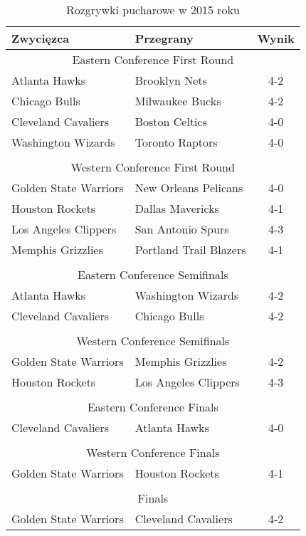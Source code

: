 \documentclass[inzynierska]{pwr_wmat_praca_dyplomowa}
\theoremstyle{plain}
\numberwithin{theorem}{chapter}
\theoremstyle{definition}
\numberwithin{theorem}{chapter}
\begin{document}
\begin{table}[]
	\centering
	\begin{tabular}{ |p{5cm}|p{5cm}|c|  }
		\hline
		\textbf{Zwycięzca}& \textbf{Przegrany} &\textbf{Wynik}\\\hline		
		\multicolumn{3}{|c|}{Eastern Conference First Round} \\\hline
		Atlanta Hawks& Brooklyn Nets &4-2\\\hline
		Chicago Bulls& Milwaukee Bucks&4-2\\\hline
		Cleveland Cavaliers& Boston Celtics &4-0\\\hline
		Washington Wizards& Toronto Raptors&4-0\\\hline
		\multicolumn{3}{|c|}{} \\\hline
		
		\multicolumn{3}{|c|}{Western Conference First Round} \\\hline
		Golden State Warriors &New Orleans Pelicans &4-0\\\hline
		Houston Rockets& Dallas Mavericks&4-1\\\hline
		Los Angeles Clippers& San Antonio Spurs &4-3\\\hline
		Memphis Grizzlies& Portland Trail Blazers&4-1\\\hline
		\multicolumn{3}{|c|}{} \\\hline

		\multicolumn{3}{|c|}{Eastern Conference Semifinals} \\\hline
		Atlanta Hawks& Washington Wizards &4-2\\\hline
		Cleveland Cavaliers& Chicago Bulls&4-2\\\hline
		\multicolumn{3}{|c|}{} \\\hline
		
		\multicolumn{3}{|c|}{Western Conference Semifinals} \\\hline
		Golden State Warriors& Memphis Grizzlies &4-2\\\hline
		Houston Rockets& Los Angeles Clippers&4-3\\\hline
		\multicolumn{3}{|c|}{} \\\hline
		
		\multicolumn{3}{|c|}{Eastern Conference Finals} \\\hline
		Cleveland Cavaliers& Atlanta Hawks&4-0\\\hline
		\multicolumn{3}{|c|}{} \\\hline
		
		\multicolumn{3}{|c|}{Western Conference Finals} \\\hline
		Golden State Warriors& Houston Rockets&4-1\\\hline
		\multicolumn{3}{|c|}{} \\\hline
		
		\multicolumn{3}{|c|}{Finals} \\\hline
		Golden State Warriors& Cleveland Cavaliers &4-2\\\hline
	\end{tabular}
\caption{Rozgrywki pucharowe w 2015 roku}\label{tabela_playoffs2015}
\end{table}
\end{document}
